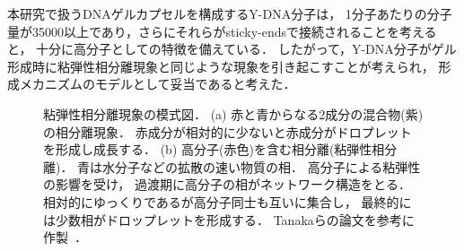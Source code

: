本研究で扱うDNAゲルカプセルを構成するY-DNA分子は，
1分子あたりの分子量が35000以上であり，さらにそれらがsticky-endsで接続されることを考えると，
十分に高分子としての特徴を備えている．
したがって，Y-DNA分子がゲル形成時に粘弾性相分離現象と同じような現象を引き起こすことが考えられ，
形成メカニズムのモデルとして妥当であると考えた．

\begin{figure}
\centering

\caption{
    粘弾性相分離現象の模式図．
    (a) 赤と青からなる2成分の混合物(紫)の相分離現象．
        赤成分が相対的に少ないと赤成分がドロプレットを形成し成長する．
    (b) 高分子(赤色)を含む相分離(粘弾性相分離)．
        青は水分子などの拡散の速い物質の相．
        高分子による粘弾性の影響を受け，
        過渡期に高分子の相がネットワーク構造をとる．
        相対的にゆっくりであるが高分子同士も互いに集合し，
        最終的には少数相がドロップレットを形成する．
    Tanakaらの論文を参考に作製~\cite{tanaka2009formation}．
}

\label{fig:veps}
\end{figure}
